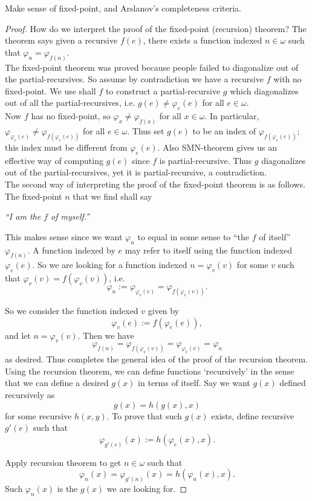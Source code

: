 \begin{theorem}
  Make sense of fixed-point, and Arslanov's completeness criteria.
\end{theorem}
\begin{proof}
  How do we interpret the proof of the fixed-point (recursion) theorem?
  The theorem says given a recursive $f(e)$, there exists a function
  indexed $n\in\omega$ such that $\varphi_n=\varphi_{f(n)}$.\\

  The fixed-point theorem was proved because people failed to
  diagonalize out of the partial-recursives. So assume by contradiction
  we have a recursive $f$ with no fixed-point. We use shall $f$ to
  construct a partial-recursive $g$ which diagonalizes out of all the
  partial-recursives, i.e. $g(e)\neq\varphi_e(e)$ for all
  $e\in\omega$.\\

  Now $f$ has no fixed-point, so $\varphi_x\neq\varphi_{f(x)}$ for all
  $x\in\omega$. In particular, $\varphi_{\varphi_e(e)} \neq
  \varphi_{f(\varphi_e(e))}$ for all $e\in\omega$. Thus set $g(e)$ to
  be an index of $\varphi_{f(\varphi_e(e))}$; this index must be
  different from $\varphi_e(e)$. Also SMN-theorem gives us an effective
  way of computing $g(e)$ since $f$ is partial-recursive. Thus $g$
  diagonalizes out of the partial-recursives, yet it is
  partial-recursive, a contradiction.\\

  The second way of interpreting the proof of the fixed-point theorem
  is as follows. The fixed-point $n$ that we find shall say
  \begin{center}
    \textit{``I am the $f$ of myself.''}
  \end{center}

  This makes sense since we want $\varphi_n$ to equal in some sense to
  ``the $f$ of itself'' $\varphi_{f(n)}$. A function indexed by $e$ may
  refer to itself using the function indexed $\varphi_e(e)$. So we are
  looking for a function indexed $n=\varphi_v(v)$ for some $v$ such
  that
  $\varphi_v(v)=f(\varphi_v(v))$, i.e.
  \[\varphi_n :=\varphi_{\varphi_v(v)} =\varphi_{f(\varphi_v(v))}.\]

  So we consider the function indexed $v$ given by
  \[\varphi_v(e) :=f(\varphi_e(e)),\]
  and let $n=\varphi_v(v)$. Then we have
  \[\varphi_{f(n)} =\varphi_{f(\varphi_v(v))} =\varphi_{\varphi_v(v)}
  =\varphi_n\]
  as desired. Thus completes the general idea of the proof of the
  recursion theorem. \\

  Using the recursion theorem, we can define functions `recursively' in
  the sense that we can define a desired $g(x)$ in terms of itself. Say
  we want $g(x)$ defined recursively as
  \[g(x)=h(g(x),x)\]
  for some recursive $h(x,y)$. To prove that such $g(x)$ exists,
  define recursive $g'(e)$ such that
  \[\varphi_{g'(e)}(x) :=h(\varphi_e(x),x).\]

  Apply recursion theorem to get $n\in\omega$ such that
  \[\varphi_n(x) =\varphi_{g'(n)}(x) =h(\varphi_n(x),x).\]
  Such $\varphi_n(x)$ is the $g(x)$ we are looking for.
\end{proof}

